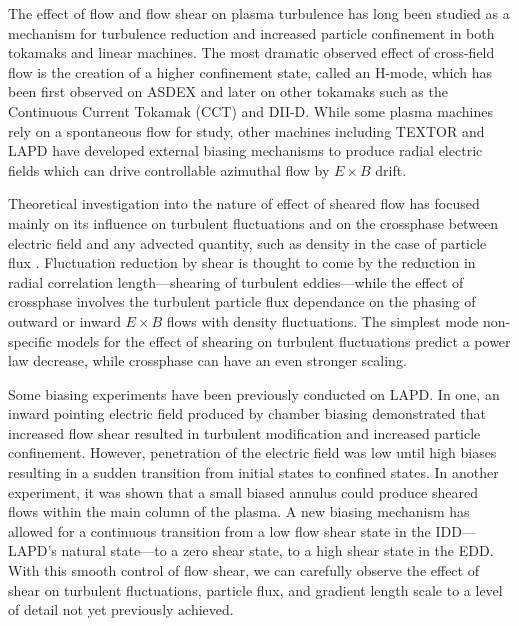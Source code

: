 \documentclass[%
 aps,
 prl,
 amsmath,amssymb,
 reprint,%
]{revtex4-1}
\begin{document}
\maketitle


The effect of flow and flow shear on plasma turbulence has long been studied as a mechanism for turbulence reduction and increased particle confinement in both tokamaks and linear machines.  The most dramatic observed effect of cross-field flow is the creation of a higher confinement state, called an H-mode, which has been first observed on ASDEX\cite{wagner82} and later on other tokamaks such as the Continuous Current Tokamak (CCT)\cite{taylor89,tynan92} and DII-D\cite{groebner90,moyer95}. While some plasma machines rely on a spontaneous flow for study\cite{tynan06}, other machines including TEXTOR\cite{boedo00} and LAPD\cite{maggs07,carter09} have developed external biasing mechanisms to produce radial electric fields which can drive controllable azimuthal flow by $E \times B$ drift\cite{weynants93}.

Theoretical investigation into the nature of effect of sheared flow has focused mainly on its influence on turbulent fluctuations \cite{biglari90} and on the crossphase between electric field and any advected quantity, such as density in the case of particle flux \cite{ware96,terry01}. Fluctuation reduction by shear is thought to come by the reduction in radial correlation length---shearing of turbulent eddies---while the effect of crossphase involves the turbulent particle flux dependance on the phasing of outward or inward $E\times B$ flows with density fluctuations. The simplest mode non-specific models for the effect of shearing on turbulent fluctuations predict a power law decrease\cite{biglari90}, while crossphase can have an even stronger scaling\cite{terry01}.

Some biasing experiments have been previously conducted on LAPD. In one, an inward pointing electric field produced by chamber biasing demonstrated that increased flow shear resulted in turbulent modification and increased particle confinement\cite{carter09}. However, penetration of the electric field was low until high biases resulting in a sudden transition from initial states to confined states. In another experiment, it was shown that a small biased annulus could produce sheared flows within the main column of the plasma\cite{zhou12}. A new biasing mechanism has allowed for a continuous transition from a low flow shear state in the IDD---LAPD's natural state---to a zero shear state, to a high shear state in the EDD. With this smooth control of flow shear, we can carefully observe the effect of shear on turbulent fluctuations, particle flux, and gradient length scale to a level of detail not yet previously achieved.
\end{document}

